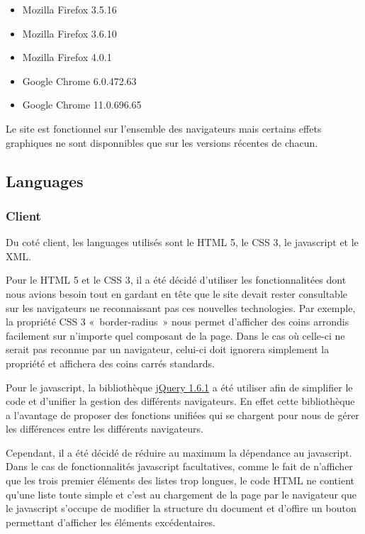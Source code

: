 \documentclass[letter, 10pt]{report}
\begin{document}
\begin{itemize}
\item Mozilla Firefox 3.5.16
\item Mozilla Firefox 3.6.10
\item Mozilla Firefox 4.0.1
\item Google Chrome 6.0.472.63
\item Google Chrome 11.0.696.65
\end{itemize}

Le site est fonctionnel sur l'ensemble des navigateurs mais certains effets graphiques ne sont disponnibles que sur les versions récentes de chacun.

\subsection{Languages}
\subsubsection{Client}
Du coté client, les languages utilisés sont le HTML 5, le CSS 3, le javascript et le XML.

Pour le HTML 5 et le CSS 3, il a été décidé d'utiliser les fonctionnalitées dont nous avions besoin tout en gardant en tête que le site devait rester consultable sur les navigateurs ne reconnaissant pas ces nouvelles technologies. Par exemple, la propriété CSS 3 «~border-radius~» nous permet d'afficher des coins arrondis facilement sur n'importe quel composant de la page. Dans le cas où celle-ci ne serait pas reconnue par un navigateur, celui-ci doit ignorera simplement la propriété et affichera des coins carrés standards.

Pour le javascript, la bibliothèque \href{http://jquery.com/}{jQuery 1.6.1} a été utiliser afin de simplifier le code et d'unifier la gestion des différents navigateurs. En effet cette bibliothèque a l'avantage de proposer des fonctions unifiées qui se chargent pour nous de gérer les différences entre les différents navigateurs.

Cependant, il a été décidé de réduire au maximum la dépendance au javascript. Dans le cas de fonctionnalités javascript facultatives, comme le fait de n'afficher que les trois premier éléments des listes trop longues, le code HTML ne contient qu'une liste toute simple et c'est au chargement de la page par le navigateur que le javascript s'occupe de modifier la structure du document et d'offire un bouton permettant d'afficher les éléments excédentaires.
\end{document}
